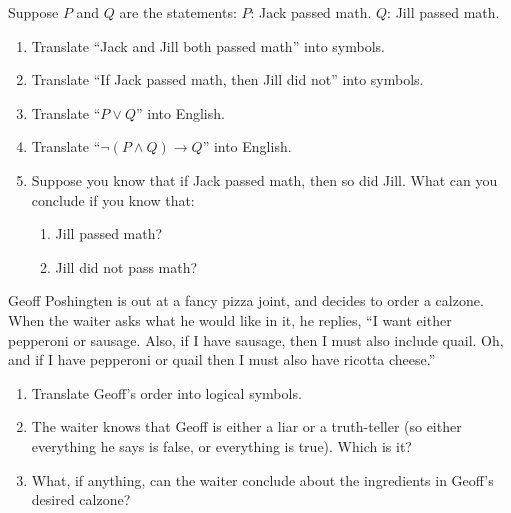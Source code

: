 \documentclass[11pt,]{book}
\theoremstyle{ptxplainnotitle}
\theoremstyle{ptxplaintitle}
\theoremstyle{ptxdefinitionnotitle}
\theoremstyle{ptxdefinitiontitle}
\theoremstyle{ptxdefinitionnotitle}
\theoremstyle{ptxdefinitiontitle}
\theoremstyle{ptxdefinitionnotitle}
\theoremstyle{ptxdefinitiontitle}
\theoremstyle{ptxdefinitiontitlenonumber}
\theoremstyle{ptxdefinitiontitlenonumber}
\numberwithin{equation}{chapter}
\newcommand{\imp}{\rightarrow}
\begin{document}
\begin{divisionexercise}{7}\hypertarget{exercise-156}{}
\hypertarget{p-2097}{}%
Suppose \(P\) and \(Q\) are the statements: \(P\): Jack passed math. \(Q\): Jill passed math. \leavevmode%
\begin{enumerate}[label=(\alph*)]
\item\hypertarget{li-1029}{}\hypertarget{p-2098}{}%
Translate ``Jack and Jill both passed math'' into symbols.%
\item\hypertarget{li-1030}{}\hypertarget{p-2099}{}%
Translate ``If Jack passed math, then Jill did not'' into symbols.%
\item\hypertarget{li-1031}{}\hypertarget{p-2100}{}%
Translate ``\(P \vee Q\)'' into English.%
\item\hypertarget{li-1032}{}\hypertarget{p-2101}{}%
Translate ``\(\neg(P \wedge Q) \imp Q\)'' into English.%
\item\hypertarget{li-1033}{}\hypertarget{p-2102}{}%
Suppose you know that if Jack passed math, then so did Jill.  What can you conclude if you know that: %
\begin{enumerate}[label=\roman*.]
\item\hypertarget{li-1034}{}Jill passed math?%
\item\hypertarget{li-1035}{}Jill did not pass math?%
\end{enumerate}
%
\end{enumerate}
%
\end{divisionexercise}%
\begin{divisionexercise}{8}\hypertarget{exercise-157}{}
\hypertarget{p-2107}{}%
Geoff Poshingten is out at a fancy pizza joint, and decides to order a calzone. When the waiter asks what he would like in it, he replies, ``I want either pepperoni or sausage. Also, if I have sausage, then I must also include quail. Oh, and if I have pepperoni or quail then I must also have ricotta cheese.'' \leavevmode%
\begin{enumerate}[label=(\alph*)]
\item\hypertarget{li-1043}{}\hypertarget{p-2108}{}%
Translate Geoff's order into logical symbols.%
\item\hypertarget{li-1044}{}\hypertarget{p-2109}{}%
The waiter knows that Geoff is either a liar or a truth-teller (so either everything he says is false, or everything is true).  Which is it?%
\item\hypertarget{li-1045}{}\hypertarget{p-2110}{}%
What, if anything, can the waiter conclude about the ingredients in Geoff's desired calzone?%
\end{enumerate}
%
\end{divisionexercise}%
\end{document}
